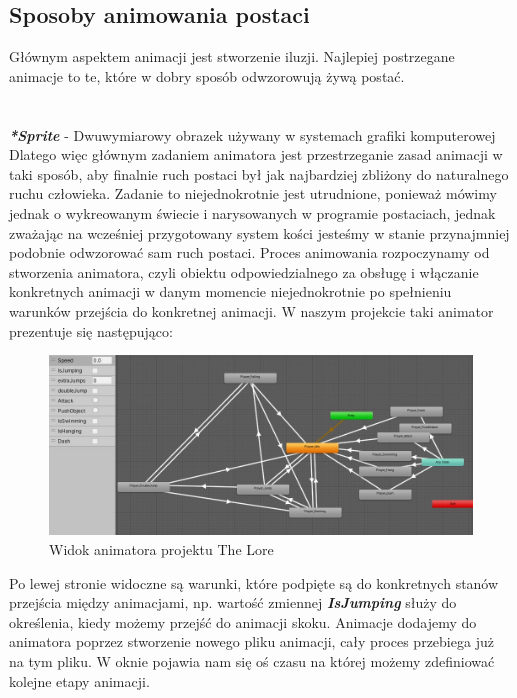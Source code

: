 \documentclass[oneside,polski,logo]{amuthesis}
\begin{document}
\subsection{Sposoby animowania postaci}
Głównym aspektem animacji jest stworzenie iluzji. Najlepiej postrzegane animacje to te, które w dobry sposób odwzorowują żywą postać.\\
\noindent\makebox[\linewidth]{\rule{15cm}{0.4pt}}\\
\\
\textbf{\textit{*Sprite}} - Dwuwymiarowy obrazek używany w systemach grafiki komputerowej \newpage
Dlatego więc głównym zadaniem animatora jest przestrzeganie zasad animacji w taki sposób, aby finalnie ruch postaci był jak najbardziej zbliżony do naturalnego ruchu człowieka.
 Zadanie to niejednokrotnie jest utrudnione, ponieważ mówimy jednak o wykreowanym świecie i narysowanych w programie postaciach, jednak zważając na wcześniej przygotowany system kości jesteśmy w stanie przynajmniej podobnie odwzorować sam ruch postaci. 
Proces animowania rozpoczynamy od stworzenia animatora, czyli obiektu odpowiedzialnego za obsługę i włączanie konkretnych animacji w danym momencie niejednokrotnie po spełnieniu warunków przejścia do konkretnej animacji. W naszym projekcie taki animator prezentuje się następująco:

\begin{figure}[h]
	\centering
	\includegraphics[width=13cm]{images/kozubal/animator.jpg}
	\caption{Widok animatora projektu The Lore}
\end{figure}

Po lewej stronie widoczne są warunki, które podpięte są do konkretnych stanów przejścia między animacjami, np. wartość zmiennej \textbf{\textit{IsJumping}} służy do określenia, kiedy możemy przejść do animacji skoku. Animacje dodajemy do animatora poprzez stworzenie nowego pliku animacji, cały proces przebiega już na tym pliku. W oknie pojawia nam się oś czasu na której możemy zdefiniować kolejne etapy animacji.\\
\end{document}
